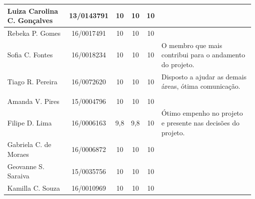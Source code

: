 \begin{apendicesenv}
\begin{table}[H]
\begin{adjustbox}{max width = \textwidth}
\begin{tabular}{|G{3.7cm}|c|c|c|c|L{6cm}|}
        Luiza Carolina C. Gonçalves & 13/0143791 & 10 & 10 & 10 &         \\ \hline
        Rebeka P. Gomes &   16/0017491 & 10 & 10 & 10  &   \\ \hline
        Sofia C. Fontes & 16/0018234 & 10 &    10    &  10   &    O membro que mais contribui para o andamento do projeto.     \\ \hline
        Tiago R. Pereira & 16/0072620 &    10    &    10     & 10 &  Disposto a ajudar as demais áreas, ótima comunicação.\\ \hline
         \\ \hline
        Amanda V. Pires & 15/0004796 & 10 & 10 & 10 &  \\ \hline
        Filipe D. Lima & 16/0006163 & 9,8 & 9,8 & 10 &  Ótimo empenho no projeto e presente nas decisões do projeto.\\ \hline
        Gabriela C. de Moraes &  16/0006872 & 10 & 10 & 10 & \\ \hline
        Geovanne S. Saraiva &  15/0035756 & 10 & 10 & 10 &  \\ \hline
        Kamilla C. Souza &  16/0010969 & 10 & 10 & 10 & \\ \hline
        \end{tabular}
    \end{adjustbox}
\end{table}

\end{apendicesenv}
